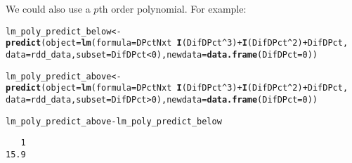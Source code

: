 \documentclass[11pt,leqno]{article}\usepackage[]{graphicx}\usepackage[]{color}
\makeatletter
\newcommand{\hlnum}[1]{\textcolor[rgb]{0.686,0.059,0.569}{#1}}%
\newcommand{\hlopt}[1]{\textcolor[rgb]{0,0,0}{#1}}%
\newcommand{\hlstd}[1]{\textcolor[rgb]{0.345,0.345,0.345}{#1}}%
\newcommand{\hlkwb}[1]{\textcolor[rgb]{0.69,0.353,0.396}{#1}}%
\newcommand{\hlkwc}[1]{\textcolor[rgb]{0.333,0.667,0.333}{#1}}%
\newcommand{\hlkwd}[1]{\textcolor[rgb]{0.737,0.353,0.396}{\textbf{#1}}}%
\newenvironment{kframe}{%
 \def\at@end@of@kframe{}%
 \ifinner\ifhmode%
  \def\at@end@of@kframe{\end{minipage}}%
  \begin{minipage}{\columnwidth}%
 \fi\fi%
 \def\FrameCommand##1{\hskip\@totalleftmargin \hskip-\fboxsep
 \colorbox{shadecolor}{##1}\hskip-\fboxsep
     \hskip-\linewidth \hskip-\@totalleftmargin \hskip\columnwidth}%
 \MakeFramed {\advance\hsize-\width
   \@totalleftmargin\z@ \linewidth\hsize
   \@setminipage}}%
 {\par\unskip\endMakeFramed%
 \at@end@of@kframe}
\newenvironment{knitrout}{}{} %
\theoremstyle{newstyle}
\makeatother
\begin{document}
We could also use a $p$th order polynomial. For example:

\begin{knitrout}\footnotesize
{}\color{fgcolor}\begin{kframe}
\begin{alltt}
\hlstd{lm_poly_predict_below} \hlkwb{<-} \hlkwd{predict}\hlstd{(}\hlkwc{object} \hlstd{=} \hlkwd{lm}\hlstd{(}\hlkwc{formula} \hlstd{= DPctNxt} \hlopt{~} \hlkwd{I}\hlstd{(DifDPct}\hlopt{^}\hlnum{3}\hlstd{)} \hlopt{+} \hlkwd{I}\hlstd{(DifDPct}\hlopt{^}\hlnum{2}\hlstd{)} \hlopt{+} \hlstd{DifDPct,}
    \hlkwc{data} \hlstd{= rdd_data,} \hlkwc{subset} \hlstd{= DifDPct} \hlopt{<} \hlnum{0}\hlstd{),} \hlkwc{newdata} \hlstd{=} \hlkwd{data.frame}\hlstd{(}\hlkwc{DifDPct} \hlstd{=} \hlnum{0}\hlstd{))}

\hlstd{lm_poly_predict_above} \hlkwb{<-} \hlkwd{predict}\hlstd{(}\hlkwc{object} \hlstd{=} \hlkwd{lm}\hlstd{(}\hlkwc{formula} \hlstd{= DPctNxt} \hlopt{~} \hlkwd{I}\hlstd{(DifDPct}\hlopt{^}\hlnum{3}\hlstd{)} \hlopt{+} \hlkwd{I}\hlstd{(DifDPct}\hlopt{^}\hlnum{2}\hlstd{)} \hlopt{+} \hlstd{DifDPct,}
    \hlkwc{data} \hlstd{= rdd_data,} \hlkwc{subset} \hlstd{= DifDPct} \hlopt{>} \hlnum{0}\hlstd{),} \hlkwc{newdata} \hlstd{=} \hlkwd{data.frame}\hlstd{(}\hlkwc{DifDPct} \hlstd{=} \hlnum{0}\hlstd{))}

\hlstd{lm_poly_predict_above} \hlopt{-} \hlstd{lm_poly_predict_below}
\end{alltt}
\begin{verbatim}
   1 
15.9 
\end{verbatim}
\end{kframe}
\end{knitrout}

\newpage


\begin{singlespace}
\end{singlespace}

\newpage
\end{document}
